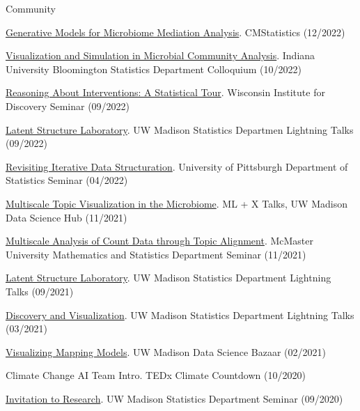 \documentclass[letterpaper]{article}
\renewenvironment{itemize}{
  \begin{list}{}{
    \setlength{\leftmargin}{1.5em}
  }
}{
  \end{list}
}
\begin{document}
Community
\begin{itemize}
  \item \href{https://krisrs1128.github.io/talks/2022/20221217/20221217.html}{Generative Models for Microbiome Mediation Analysis}. CMStatistics (12/2022)
  \item \href{https://krisrs1128.github.io/talks/2022/20221021/20221021.html}{Visualization and Simulation in Microbial Community Analysis}. Indiana University Bloomington Statistics Department Colloquium (10/2022)
  \item \href{https://krisrs1128.github.io/LSLab/talks/#:~:text=Reasoning%20About%20Interventions%3A%20A%20Statistical%20Tour}{Reasoning About Interventions: A Statistical Tour}. Wisconsin Institute for Discovery Seminar (09/2022)
  \item \href{https://krisrs1128.github.io/talks/2022/20220916/20220916.html}{Latent Structure Laboratory}. UW Madison Statistics Departmen Lightning Talks (09/2022)
  \item \href{https://drive.google.com/file/d/1ju9f8e8aRb5OYLE28Ub0Pc6i2KCpcjgN/view?usp=sharing}{Revisiting Iterative Data Structuration}. University of Pittsburgh Department of Statistics Seminar (04/2022)
  \item \href{https://drive.google.com/file/d/14Lwhvd28sGEMSpw3AXZUsg8XXL25Gr4J/view?usp=sharing}{Multiscale Topic Visualization in the Microbiome}. ML + X Talks, UW Madison Data Science Hub (11/2021)
  \item \href{https://drive.google.com/file/d/1vcs_aLp6gZFixenGscrj6C5koEltxvGa/view?usp=sharing}{Multiscale Analysis of Count Data through Topic Alignment}. McMaster University Mathematics and Statistics Department Seminar (11/2021)
  \item \href{https://drive.google.com/file/d/1xwYyGc1bx7W-F5QyQlB3OJZT7MVTpdYd/view?usp=sharing}{Latent Structure Laboratory}. UW Madison Statistics Department Lightning Talks (09/2021)
  \item \href{https://drive.google.com/drive/folders/16P8ZeKM1IEZFgCHgSxakUymamMZkNkTl}{Discovery and Visualization}. UW Madison Statistics Department Lightning Talks (03/2021)
  \item \href{https://krisrs1128.github.io/mapping-vis/}{Visualizing Mapping Models}. UW Madison Data Science Bazaar (02/2021)
  \item Climate Change AI Team Intro. TEDx Climate Countdown (10/2020)
  \item \href{https://drive.google.com/file/d/1xwYyGc1bx7W-F5QyQlB3OJZT7MVTpdYd/view?usp=sharing}{Invitation to Research}. UW Madison Statistics Department Seminar (09/2020)

\end{itemize}
\end{document}
